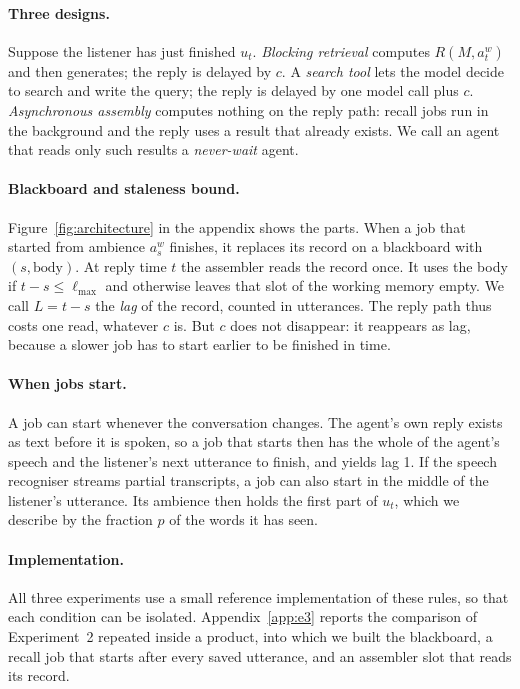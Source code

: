 \documentclass[10pt]{article}
\newcommand{\lmax}{\ell_{\max}}
\begin{document}
\paragraph{Three designs.} Suppose the listener has just finished $u_t$. \emph{Blocking retrieval} computes $R(M, a^{w}_{t})$ and then generates; the reply is delayed by $c$. A \emph{search tool} lets the model decide to search and write the query; the reply is delayed by one model call plus $c$. \emph{Asynchronous assembly} computes nothing on the reply path: recall jobs run in the background and the reply uses a result that already exists. We call an agent that reads only such results a \emph{never-wait} agent.

\paragraph{Blackboard and staleness bound.} Figure~\ref{fig:architecture} in the appendix shows the parts. When a job that started from ambience $a^{w}_{s}$ finishes, it replaces its record on a blackboard with $(s, \text{body})$. At reply time $t$ the assembler reads the record once. It uses the body if $t - s \le \lmax$ and otherwise leaves that slot of the working memory empty. We call $L = t - s$ the \emph{lag} of the record, counted in utterances. The reply path thus costs one read, whatever $c$ is. But $c$ does not disappear: it reappears as lag, because a slower job has to start earlier to be finished in time.

\paragraph{When jobs start.} A job can start whenever the conversation changes. The agent's own reply exists as text before it is spoken, so a job that starts then has the whole of the agent's speech and the listener's next utterance to finish, and yields lag 1. If the speech recogniser streams partial transcripts, a job can also start in the middle of the listener's utterance. Its ambience then holds the first part of $u_t$, which we describe by the fraction $p$ of the words it has seen.

\paragraph{Implementation.} All three experiments use a small reference implementation of these rules, so that each condition can be isolated. Appendix~\ref{app:e3} reports the comparison of Experiment~2 repeated inside a product, into which we built the blackboard, a recall job that starts after every saved utterance, and an assembler slot that reads its record.
\end{document}
